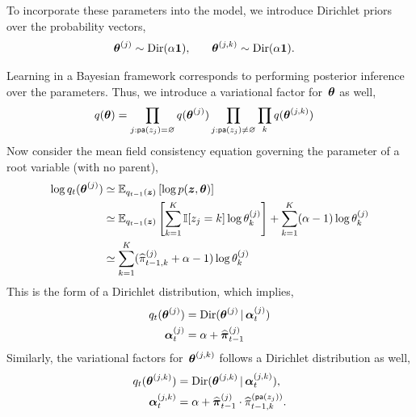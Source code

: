 To incorporate these parameters into the model, we introduce Dirichlet priors
over the probability vectors,
\begin{align*}
  \boldsymbol{\theta}^{(j)} &\sim \mathrm{Dir}(\alpha \boldsymbol{1}), & & &
  \boldsymbol{\theta}^{(j,k)} &\sim \mathrm{Dir}(\alpha \boldsymbol{1}).
\end{align*}

Learning in a Bayesian framework corresponds to performing posterior
inference over the parameters. Thus, we introduce a variational factor
for~$\boldsymbol{\theta}$ as well,
\begin{align*}
  q(\boldsymbol{\theta}) &=
  \prod_{j: \mathsf{pa}(z_j)=\varnothing} q(\boldsymbol{\theta}^{(j)})
  \prod_{j: \mathsf{pa}(z_j)\neq \varnothing} \prod_{k} q(\boldsymbol{\theta}^{(j,k)})
\end{align*}
Now consider the mean field consistency equation governing the parameter
of a root variable (with no parent),
\begin{align*}
  \log q_t(\boldsymbol{\theta}^{(j)}) &\simeq
  \mathbb{E}_{q_{t-1}(\boldsymbol{z})}\left[ \log p(\boldsymbol{z}, \boldsymbol{\theta}) \right] \\
  &\simeq \mathbb{E}_{q_{t-1}(\boldsymbol{z})}
  \left[ \sum_{k=1}^K \mathbb{I}[z_j=k] \log \theta_k^{(j)} \right]
  + \sum_{k=1}^K (\alpha-1) \log \theta_k^{(j)}  \\
  &\simeq  \sum_{k=1}^K (\widehat{\pi}_{t-1,k}^{(j)} + \alpha-1) \log \theta_k^{(j)}
\end{align*}
This is the form of a Dirichlet distribution, which implies,
\begin{align*}
  q_t(\boldsymbol{\theta}^{(j)})
  &= \mathrm{Dir}(\boldsymbol{\theta}^{(j)} \,|\,  \boldsymbol{\alpha}_{t}^{(j)}) \\
  \boldsymbol{\alpha}_{t}^{(j)} &= \alpha + \widehat{\boldsymbol{\pi}}_{t-1}^{(j)}
\end{align*}
Similarly, the variational factors for~$\boldsymbol{\theta}^{(j,k)}$
follows a Dirichlet distribution as well,
\begin{align*}
  q_t(\boldsymbol{\theta}^{(j,k)}) &=
  \mathrm{Dir}(\boldsymbol{\theta}^{(j,k)} \,|\, \boldsymbol{\alpha}_{t}^{(j,k)}), \\
  \boldsymbol{\alpha}_{t}^{(j,k)} &= \alpha + \widehat{\boldsymbol{\pi}}_{t-1}^{(j)} \cdot \widehat{\pi}_{t-1,k}^{(\mathsf{pa}(z_j))}.
\end{align*}

